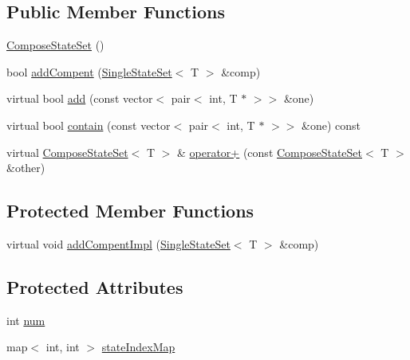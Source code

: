 \subsection*{Public Member Functions}
\begin{DoxyCompactItemize}
\item 
\mbox{\hyperlink{classgraphsat_1_1_compose_state_set_aef6ac032dff8b476edd7c7cb6c4bd164}{Compose\+State\+Set}} ()
\item 
bool \mbox{\hyperlink{classgraphsat_1_1_compose_state_set_a205740accb316d74a4af24e2a91b3a6d}{add\+Compent}} (\mbox{\hyperlink{classgraphsat_1_1_single_state_set}{Single\+State\+Set}}$<$ T $>$ \&comp)
\item 
virtual bool \mbox{\hyperlink{classgraphsat_1_1_compose_state_set_a0f359257087c8ae10bf25881f9448395}{add}} (const vector$<$ pair$<$ int, T $\ast$ $>$$>$ \&one)
\item 
virtual bool \mbox{\hyperlink{classgraphsat_1_1_compose_state_set_abfd0e46ca8319f69a506b7854850782b}{contain}} (const vector$<$ pair$<$ int, T $\ast$ $>$$>$ \&one) const
\item 
virtual \mbox{\hyperlink{classgraphsat_1_1_compose_state_set}{Compose\+State\+Set}}$<$ T $>$ \& \mbox{\hyperlink{classgraphsat_1_1_compose_state_set_a615b1e99b8dd086e1112bf424e29bd16}{operator+}} (const \mbox{\hyperlink{classgraphsat_1_1_compose_state_set}{Compose\+State\+Set}}$<$ T $>$ \&other)
\end{DoxyCompactItemize}
\subsection*{Protected Member Functions}
\begin{DoxyCompactItemize}
\item 
virtual void \mbox{\hyperlink{classgraphsat_1_1_compose_state_set_a143dc652308b16919867155d59fa0a09}{add\+Compent\+Impl}} (\mbox{\hyperlink{classgraphsat_1_1_single_state_set}{Single\+State\+Set}}$<$ T $>$ \&comp)
\end{DoxyCompactItemize}
\subsection*{Protected Attributes}
\begin{DoxyCompactItemize}
\item 
int \mbox{\hyperlink{classgraphsat_1_1_compose_state_set_a26fd1ff0f5da83459419e542597dbf2d}{num}}
\item 
map$<$ int, int $>$ \mbox{\hyperlink{classgraphsat_1_1_compose_state_set_abf29da88a54ef280473d506130ef6bc3}{state\+Index\+Map}}
\end{DoxyCompactItemize}


